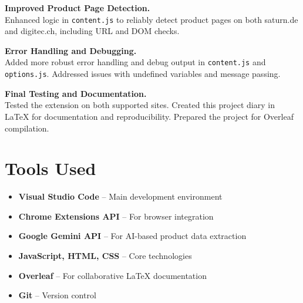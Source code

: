 \documentclass{article}
\begin{document}
\begin{description}[leftmargin=!,labelwidth=2.5cm]
\item[03.05.2025] 
\textbf{Improved Product Page Detection.} \\ 
Enhanced logic in \texttt{content.js} to reliably detect product pages on both saturn.de and digitec.ch, including URL and DOM checks.

\item[06.05.2025] 
\textbf{Error Handling and Debugging.} \\ 
Added more robust error handling and debug output in \texttt{content.js} and \texttt{options.js}. Addressed issues with undefined variables and message passing.

\item[09.05.2025] 
\textbf{Final Testing and Documentation.} \\ 
Tested the extension on both supported sites. Created this project diary in LaTeX for documentation and reproducibility. Prepared the project for Overleaf compilation.

\end{description}

\section*{Tools Used}
\begin{itemize}
  \item \textbf{Visual Studio Code} -- Main development environment
  \item \textbf{Chrome Extensions API} -- For browser integration
  \item \textbf{Google Gemini API} -- For AI-based product data extraction
  \item \textbf{JavaScript, HTML, CSS} -- Core technologies
  \item \textbf{Overleaf} -- For collaborative LaTeX documentation
  \item \textbf{Git} -- Version control
\end{itemize}
\end{document}
